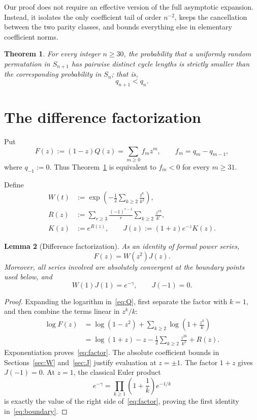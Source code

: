 \documentclass[11pt]{amsart}
\newtheorem{theorem}{Theorem}[section]
\newtheorem{lemma}[theorem]{Lemma}
\theoremstyle{remark}
\begin{document}
Our proof does not require an effective version of the full asymptotic
expansion. Instead, it isolates the only coefficient tail of order
\(n^{-2}\), keeps the cancellation between the two parity classes, and
bounds everything else in elementary coefficient norms.

\begin{theorem}\label{thm:main}
For every integer \(n\ge30\), the probability that a uniformly random
permutation in \(S_{n+1}\) has pairwise distinct cycle lengths is strictly
smaller than the corresponding probability in \(S_n\); that is,
\[
q_{n+1}<q_n.
\]
\end{theorem}

\section{The difference factorization}

Put
\[
 F(z):=(1-z)Q(z)=\sum_{m\ge0}f_mz^m,
 \qquad f_m=q_m-q_{m-1},
\]
where \(q_{-1}:=0\). Thus Theorem~\ref{thm:main} is equivalent to
\(f_m<0\) for every \(m\ge31\).

Define
\begin{align}
 W(t)&:=\exp\!\left(-\frac12\sum_{k\ge2}\frac{t^k}{k^2}\right),
                                                        \label{eq:W}\\
 R(z)&:=\sum_{r\ge3}\frac{(-1)^{r-1}}r
              \sum_{k\ge2}\frac{z^{rk}}{k^r},          \label{eq:R}\\
 K(z)&:=e^{R(z)},\qquad
 J(z):=(1+z)e^{-z}K(z).                                 \label{eq:J}
\end{align}

\begin{lemma}[Difference factorization]\label{lem:factor}
As an identity of formal power series,
\begin{equation}\label{eq:factor}
 F(z)=W(z^2)J(z).
\end{equation}
Moreover, all series involved are absolutely convergent at the boundary
points used below, and
\begin{equation}\label{eq:boundary}
 W(1)J(1)=e^{-\gamma},\qquad J(-1)=0.
\end{equation}
\end{lemma}

\begin{proof}
Expanding the logarithm in~\eqref{eq:Q}, first separate the factor with
\(k=1\), and then combine the terms linear in \(z^k/k\):
\begin{align*}
 \log F(z)
 &=\log(1-z^2)+\sum_{k\ge2}\log\left(1+\frac{z^k}{k}\right)\\
 &=\log(1+z)-z
   -\frac12\sum_{k\ge2}\frac{z^{2k}}{k^2}+R(z).
\end{align*}
Exponentiation proves~\eqref{eq:factor}. The absolute coefficient bounds in
Sections~\ref{sec:W} and~\ref{sec:J} justify evaluation at \(z=\pm1\).
The factor \(1+z\) gives \(J(-1)=0\). At \(z=1\), the classical Euler
product
\[
 e^{-\gamma}=\prod_{k\ge1}\left(1+\frac1k\right)e^{-1/k}
\]
is exactly the value of the right side of~\eqref{eq:factor}, proving the
first identity in~\eqref{eq:boundary}.
\end{proof}
\end{document}
